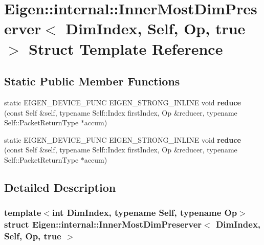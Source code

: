 \hypertarget{struct_eigen_1_1internal_1_1_inner_most_dim_preserver_3_01_dim_index_00_01_self_00_01_op_00_01true_01_4}{}\section{Eigen\+:\+:internal\+:\+:Inner\+Most\+Dim\+Preserver$<$ Dim\+Index, Self, Op, true $>$ Struct Template Reference}
\label{struct_eigen_1_1internal_1_1_inner_most_dim_preserver_3_01_dim_index_00_01_self_00_01_op_00_01true_01_4}
\subsection*{Static Public Member Functions}
\begin{DoxyCompactItemize}
\item 
\mbox{\label{struct_eigen_1_1internal_1_1_inner_most_dim_preserver_3_01_dim_index_00_01_self_00_01_op_00_01true_01_4_ae50bbff1e15661f9d984ecc5583469ce}} 
static E\+I\+G\+E\+N\+\_\+\+D\+E\+V\+I\+C\+E\+\_\+\+F\+U\+NC E\+I\+G\+E\+N\+\_\+\+S\+T\+R\+O\+N\+G\+\_\+\+I\+N\+L\+I\+NE void {\bfseries reduce} (const Self \&self, typename Self\+::\+Index first\+Index, Op \&reducer, typename Self\+::\+Packet\+Return\+Type $\ast$accum)
\item 
\mbox{\label{struct_eigen_1_1internal_1_1_inner_most_dim_preserver_3_01_dim_index_00_01_self_00_01_op_00_01true_01_4_ae50bbff1e15661f9d984ecc5583469ce}} 
static E\+I\+G\+E\+N\+\_\+\+D\+E\+V\+I\+C\+E\+\_\+\+F\+U\+NC E\+I\+G\+E\+N\+\_\+\+S\+T\+R\+O\+N\+G\+\_\+\+I\+N\+L\+I\+NE void {\bfseries reduce} (const Self \&self, typename Self\+::\+Index first\+Index, Op \&reducer, typename Self\+::\+Packet\+Return\+Type $\ast$accum)
\end{DoxyCompactItemize}


\subsection{Detailed Description}
\subsubsection*{template$<$int Dim\+Index, typename Self, typename Op$>$\newline
struct Eigen\+::internal\+::\+Inner\+Most\+Dim\+Preserver$<$ Dim\+Index, Self, Op, true $>$}



